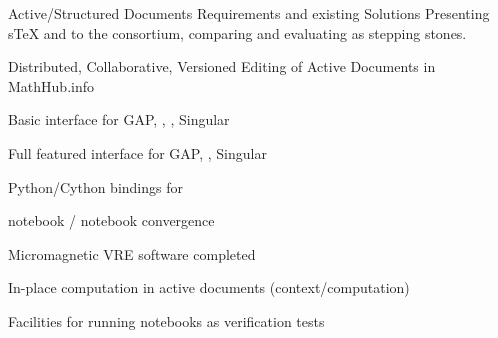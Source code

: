\begin{workpackage}
\begin{wpdelivs}
  \begin{wpdeliv}[id=adstex,due=6,nature=R,dissem=PU,lead=JU]
    {Active/Structured Documents Requirements and existing Solutions} Presenting sTeX and
    \Jupyter to the consortium, comparing and evaluating as stepping stones.
  \end{wpdeliv}
    \begin{wpdeliv}[id=mathhub-editing,due=12,nature=DEM,dissem=PU,lead=JU]
      {Distributed, Collaborative, Versioned Editing of Active Documents in MathHub.info}
    \end{wpdeliv}
  \begin{wpdeliv}[due=14,id=ipython-kernels-basic,dissem=PU,nature=OTHER,lead=PS]
      {Basic \Jupyter interface for GAP, \PariGP, \Sage, Singular}
  \end{wpdeliv}
  \begin{wpdeliv}[due=12,id=ipython-kernels,dissem=PU,nature=OTHER,lead=PS]
      {Full featured \Jupyter interface for GAP, \PariGP, Singular}
  \end{wpdeliv}
  \begin{wpdeliv}[due=24,id=pari-python-lib,dissem=PU,nature=OTHER,lead=UB]
	  {Python/Cython bindings for \PariGP}
  \end{wpdeliv}
  \begin{wpdeliv}[due=12,id=ipython-kernel-sage,dissem=PU,nature=DEM,lead=PS]
      {\Sage notebook / \Jupyter notebook convergence}
  \end{wpdeliv}
    \begin{wpdeliv}[due=15,id=oommf-nb,dissem=PU,nature=OTHER,lead=USO]
      {Micromagnetic VRE software completed}
    \end{wpdeliv}

    \begin{wpdeliv}[id=adcomp,due=18,nature=DEM,dissem=PU,lead=JU]
      {In-place computation in active documents (context/computation)}
    \end{wpdeliv}

  \begin{wpdeliv}[due=18,id=jupyter-test,dissem=PU,nature=OTHER,lead=SR]
      {Facilities for running notebooks as verification tests}
  \end{wpdeliv}


\end{wpdelivs}
\end{workpackage}

